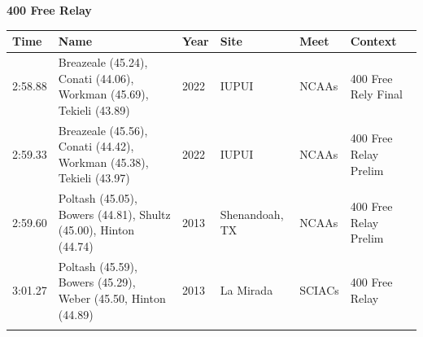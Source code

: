 \noindent\begin{minipage}[t]{0.98\textwidth}
\centering
\textbf{\textcolor{teamprimary}{400 Free Relay}}\par
\vspace{0.5em}
\centering
\small
\renewcommand{\arraystretch}{1.0}
\setlength{\tabcolsep}{4pt}
\begin{tabular}{@{}p{2.0cm}p{3.2cm}p{1.2cm}p{2.0cm}p{2.0cm}p{2.5cm}@{}}
\toprule
\textbf{Time} & \textbf{Name} & \textbf{Year} & \textbf{Site} & \textbf{Meet} & \textbf{Context} \\
\midrule
2:58.88 & Breazeale (45.24), Conati (44.06), Workman (45.69), Tekieli (43.89) & 2022 & IUPUI & NCAAs & 400 Free Rely Final \\
2:59.33 & Breazeale (45.56), Conati (44.42), Workman (45.38), Tekieli (43.97) & 2022 & IUPUI & NCAAs & 400 Free Relay Prelim \\
2:59.60 & Poltash (45.05), Bowers (44.81), Shultz (45.00), Hinton (44.74) & 2013 & Shenandoah, TX & NCAAs & 400 Free Relay Prelim \\
3:01.27 & Poltash (45.59), Bowers (45.29), Weber (45.50, Hinton (44.89) & 2013 & La Mirada & SCIACs & 400 Free Relay \\
\bottomrule
\vspace{0.5em}
\end{tabular}
\end{minipage}
\vspace{1.2em}
